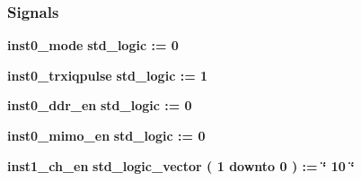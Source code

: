 \subsubsection*{Signals}
 \begin{DoxyCompactItemize}
\item 
{\bf inst0\+\_\+mode} {\bfseries \textcolor{comment}{std\+\_\+logic}\textcolor{vhdlchar}{ }\textcolor{vhdlchar}{ }\textcolor{vhdlchar}{\+:}\textcolor{vhdlchar}{=}\textcolor{vhdlchar}{ }\textcolor{vhdlchar}{ }\textcolor{vhdlchar}{\textquotesingle{}}\textcolor{vhdlchar}{ } \textcolor{vhdldigit}{0} \textcolor{vhdlchar}{ }\textcolor{vhdlchar}{\textquotesingle{}}\textcolor{vhdlchar}{ }} 
\item 
{\bf inst0\+\_\+trxiqpulse} {\bfseries \textcolor{comment}{std\+\_\+logic}\textcolor{vhdlchar}{ }\textcolor{vhdlchar}{ }\textcolor{vhdlchar}{\+:}\textcolor{vhdlchar}{=}\textcolor{vhdlchar}{ }\textcolor{vhdlchar}{ }\textcolor{vhdlchar}{\textquotesingle{}}\textcolor{vhdlchar}{ } \textcolor{vhdldigit}{1} \textcolor{vhdlchar}{ }\textcolor{vhdlchar}{\textquotesingle{}}\textcolor{vhdlchar}{ }} 
\item 
{\bf inst0\+\_\+ddr\+\_\+en} {\bfseries \textcolor{comment}{std\+\_\+logic}\textcolor{vhdlchar}{ }\textcolor{vhdlchar}{ }\textcolor{vhdlchar}{\+:}\textcolor{vhdlchar}{=}\textcolor{vhdlchar}{ }\textcolor{vhdlchar}{ }\textcolor{vhdlchar}{\textquotesingle{}}\textcolor{vhdlchar}{ } \textcolor{vhdldigit}{0} \textcolor{vhdlchar}{ }\textcolor{vhdlchar}{\textquotesingle{}}\textcolor{vhdlchar}{ }} 
\item 
{\bf inst0\+\_\+mimo\+\_\+en} {\bfseries \textcolor{comment}{std\+\_\+logic}\textcolor{vhdlchar}{ }\textcolor{vhdlchar}{ }\textcolor{vhdlchar}{\+:}\textcolor{vhdlchar}{=}\textcolor{vhdlchar}{ }\textcolor{vhdlchar}{ }\textcolor{vhdlchar}{\textquotesingle{}}\textcolor{vhdlchar}{ } \textcolor{vhdldigit}{0} \textcolor{vhdlchar}{ }\textcolor{vhdlchar}{\textquotesingle{}}\textcolor{vhdlchar}{ }} 
\item 
{\bf inst1\+\_\+ch\+\_\+en} {\bfseries \textcolor{comment}{std\+\_\+logic\+\_\+vector}\textcolor{vhdlchar}{ }\textcolor{vhdlchar}{(}\textcolor{vhdlchar}{ }\textcolor{vhdlchar}{ } \textcolor{vhdldigit}{1} \textcolor{vhdlchar}{ }\textcolor{keywordflow}{downto}\textcolor{vhdlchar}{ }\textcolor{vhdlchar}{ } \textcolor{vhdldigit}{0} \textcolor{vhdlchar}{ }\textcolor{vhdlchar}{)}\textcolor{vhdlchar}{ }\textcolor{vhdlchar}{ }\textcolor{vhdlchar}{ }\textcolor{vhdlchar}{\+:}\textcolor{vhdlchar}{=}\textcolor{vhdlchar}{ }\textcolor{vhdlchar}{ }\textcolor{vhdlchar}{ }\textcolor{vhdlchar}{ }\textcolor{keyword}{\char`\"{} 10 \char`\"{}}\textcolor{vhdlchar}{ }} 

\end{DoxyCompactItemize}
